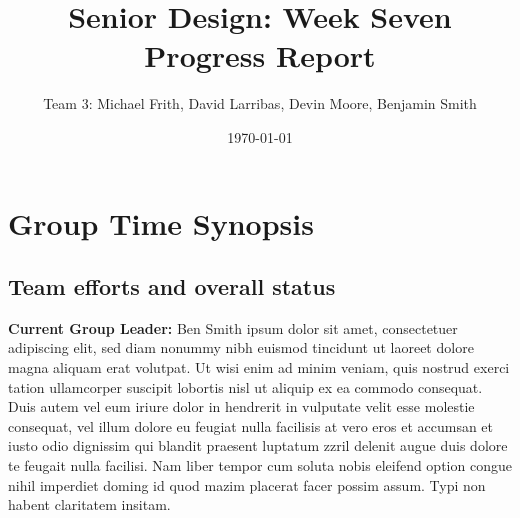 \documentclass[12pt,journal]{IEEEtran}
\begin{document}
\title{Senior Design: Week Seven Progress Report}
\author{Team 3: Michael Frith, David Larribas, Devin Moore, Benjamin Smith}
\date{\today}
\maketitle

\section{Group Time Synopsis}
	\subsection{Team efforts and overall status}
	{\bfseries Current Group Leader:} Ben Smith
	 ipsum dolor sit amet, consectetuer adipiscing elit, sed diam nonummy nibh 
	euismod tincidunt ut laoreet dolore magna aliquam erat volutpat. Ut wisi enim ad minim veniam, quis 
	nostrud exerci tation ullamcorper suscipit lobortis nisl ut aliquip ex ea commodo consequat. Duis 
	autem vel eum iriure dolor in hendrerit in vulputate velit esse molestie consequat, vel illum dolore 
	eu feugiat nulla facilisis at vero eros et accumsan et iusto odio dignissim qui blandit praesent luptatum 
	zzril delenit augue duis dolore te feugait nulla facilisi. Nam liber tempor cum soluta nobis eleifend option 
	congue nihil imperdiet doming id quod mazim placerat facer possim assum. Typi non habent claritatem insitam.

\end{document}
